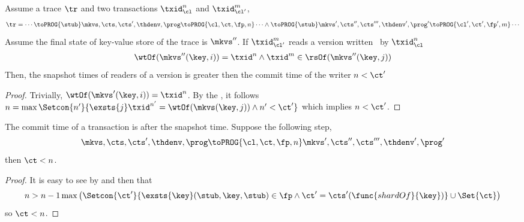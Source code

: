\begin{lemma}
    \label{lem:clock-si-reader-greater-than-writer}
    Assume a trace \( \tr \) and two transactions \( \txid_{\cl}^n\) and \( \txid_{\cl'}^m \),
        \[
            \begin{array}{@{}l@{}}
                \tr = \cdots \toPROG{\stub} \mkvs,\cts,\cts',\thdenv, \prog \toPROG{\cl,\ct,\fp,n} \cdots \land
                \toPROG{\stub} \mkvs',\cts'',\cts''',\thdenv', \prog' \toPROG{\cl',\ct',\fp',m} \cdots
            \end{array}
        \]
    Assume the final state of key-value store of the trace is \( \mkvs'' \).
    If  \( \txid_{\cl'}^m \) reads a version written \ by \( \txid_{\cl}^n\)
    \[
        \begin{array}{@{}l@{}}
            \wtOf(\mkvs''(\key,i)) = \txid^n 
            \land \txid^m \in \rsOf(\mkvs''(\key,j))
        \end{array}
    \]
    Then, the snapshot times of readers of a version is greater then the commit time of the writer \( n < \ct' \)
\end{lemma}
\begin{proof}
    Trivially, \( \wtOf(\mkvs'(\key,i)) = \txid^n \).
    By the , it follows \( n  = \max\Setcon{n'}{ \exsts{j} \txid^{n'} = \wtOf(\mkvs(\key, j)) \land n' < \ct' } \) which implies \( n < \ct' \).
\end{proof}


\begin{lemma}
    \label{lem:commit-after-snapshot-time}
    The commit time of a transaction is after the snapshot time.
    Suppose the following step,
    \[
        \mkvs,\cts,\cts',\thdenv, \prog \toPROG{\cl,\ct,\fp,n} \mkvs',\cts'',\cts''',\thdenv', \prog'
    \]
    then \( \ct < n \).
\end{lemma}
\begin{proof}
    It is easy to see by  and then  that 
    \[
        n > n - 1 \max\left( \Setcon{\ct'}{\exsts{\key} (\stub, \key, \stub) \in \fp \land \ct' = \cts'(\func{shardOf}{\key})} \cup \Set{\ct} \right)
    \]
    so \( \ct < n \).
\end{proof}


